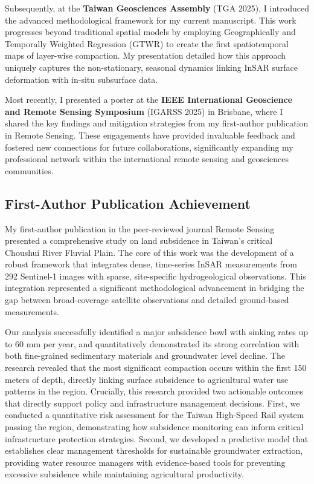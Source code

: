 \documentclass[12pt, a4paper]{article}
\begin{document}
	Subsequently, at the \textbf{Taiwan Geosciences Assembly} (TGA 2025), I introduced the advanced methodological framework for my current manuscript. This work progresses beyond traditional spatial models by employing Geographically and Temporally Weighted Regression (GTWR) to create the first spatiotemporal maps of layer-wise compaction. My presentation detailed how this approach uniquely captures the non-stationary, seasonal dynamics linking InSAR surface deformation with in-situ subsurface data.
		
	Most recently, I presented a poster at the \textbf{IEEE International Geoscience and Remote Sensing Symposium} (IGARSS 2025) in Brisbane, where I shared the key findings and mitigation strategies from my first-author publication in Remote Sensing. These engagements have provided invaluable feedback and fostered new connections for future collaborations, significantly expanding my professional network within the international remote sensing and geosciences communities.
	
	\subsection{First-Author Publication Achievement}
	
	My first-author publication in the peer-reviewed journal Remote Sensing presented a comprehensive study on land subsidence in Taiwan's critical Choushui River Fluvial Plain. The core of this work was the development of a robust framework that integrates dense, time-series InSAR measurements from 292 Sentinel-1 images with sparse, site-specific hydrogeological observations. This integration represented a significant methodological advancement in bridging the gap between broad-coverage satellite observations and detailed ground-based measurements.
	
	Our analysis successfully identified a major subsidence bowl with sinking rates up to 60 mm per year, and quantitatively demonstrated its strong correlation with both fine-grained sedimentary materials and groundwater level decline. The research revealed that the most significant compaction occurs within the first 150 meters of depth, directly linking surface subsidence to agricultural water use patterns in the region. Crucially, this research provided two actionable outcomes that directly support policy and infrastructure management decisions. First, we conducted a quantitative risk assessment for the Taiwan High-Speed Rail system passing the region, demonstrating how subsidence monitoring can inform critical infrastructure protection strategies. Second, we developed a predictive model that establishes clear management thresholds for sustainable groundwater extraction, providing water resource managers with evidence-based tools for preventing excessive subsidence while maintaining agricultural productivity.
	
\end{document}

